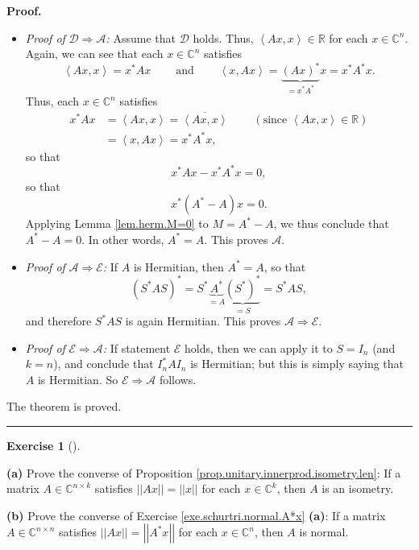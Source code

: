 \documentclass[numbers=enddot,12pt,final,onecolumn,notitlepage]{scrartcl}%
\newcounter{exer}
\numberwithin{exer}{subsection}
\theoremstyle{definition}
\newtheorem{exmp}[exer]{Exercise}
\newenvironment{exercise}[1][]
{\begin{exmp}[#1]\begin{leftbar}}
{\end{leftbar}\end{exmp}}
\newenvironment{proof}[1][Proof]{\noindent\textbf{#1.} }{\ \rule{0.5em}{0.5em}}
\begin{document}
\begin{proof}
\begin{itemize}
\item \textit{Proof of }$\mathcal{D}\Longrightarrow\mathcal{A}$\textit{:}
Assume that $\mathcal{D}$ holds. Thus, $\left\langle Ax,x\right\rangle
\in\mathbb{R}$ for each $x\in\mathbb{C}^{n}$. Again, we can see that each
$x\in\mathbb{C}^{n}$ satisfies%
\[
\left\langle Ax,x\right\rangle =x^{\ast}Ax\ \ \ \ \ \ \ \ \ \ \text{and}%
\ \ \ \ \ \ \ \ \ \ \left\langle x,Ax\right\rangle =\underbrace{\left(
Ax\right)  ^{\ast}}_{=x^{\ast}A^{\ast}}x=x^{\ast}A^{\ast}x.
\]
Thus, each $x\in\mathbb{C}^{n}$ satisfies%
\begin{align*}
x^{\ast}Ax  &  =\left\langle Ax,x\right\rangle =\overline{\left\langle
Ax,x\right\rangle }\ \ \ \ \ \ \ \ \ \ \left(  \text{since }\left\langle
Ax,x\right\rangle \in\mathbb{R}\right) \\
&  =\left\langle x,Ax\right\rangle =x^{\ast}A^{\ast}x,
\end{align*}
so that
\[
x^{\ast}Ax-x^{\ast}A^{\ast}x=0,
\]
so that%
\[
x^{\ast}\left(  A^{\ast}-A\right)  x=0.
\]
Applying Lemma \ref{lem.herm.M=0} to $M=A^{\ast}-A$, we thus conclude that
$A^{\ast}-A=0$. In other words, $A^{\ast}=A$. This proves $\mathcal{A}$.

\item \textit{Proof of }$\mathcal{A}\Longrightarrow\mathcal{E}$\textit{:} If
$A$ is Hermitian, then $A^{\ast}=A$, so that%
\[
\left(  S^{\ast}AS\right)  ^{\ast}=S^{\ast}\underbrace{A^{\ast}}%
_{=A}\underbrace{\left(  S^{\ast}\right)  ^{\ast}}_{=S}=S^{\ast}AS,
\]
and therefore $S^{\ast}AS$ is again Hermitian. This proves $\mathcal{A}%
\Longrightarrow\mathcal{E}$.

\item \textit{Proof of }$\mathcal{E}\Longrightarrow\mathcal{A}$\textit{:} If
statement $\mathcal{E}$ holds, then we can apply it to $S=I_{n}$ (and $k=n$),
and conclude that $I_{n}^{\ast}AI_{n}$ is Hermitian; but this is simply saying
that $A$ is Hermitian. So $\mathcal{E}\Longrightarrow\mathcal{A}$ follows.
\end{itemize}

The theorem is proved.
\end{proof}

\begin{exercise}
 \textbf{(a)} Prove the converse of Proposition
\ref{prop.unitary.innerprod.isometry.len}: If a matrix $A\in\mathbb{C}%
^{n\times k}$ satisfies $\left\vert \left\vert Ax\right\vert \right\vert
=\left\vert \left\vert x\right\vert \right\vert $ for each $x\in\mathbb{C}%
^{k}$, then $A$ is an isometry. \medskip

\textbf{(b)} Prove the converse of Exercise \ref{exe.schurtri.normal.A*x}
\textbf{(a)}: If a matrix $A\in\mathbb{C}^{n\times n}$ satisfies $\left\vert
\left\vert Ax\right\vert \right\vert =\left\vert \left\vert A^{\ast
}x\right\vert \right\vert $ for each $x\in\mathbb{C}^{n}$, then $A$ is normal.
\end{exercise}
\end{document}
